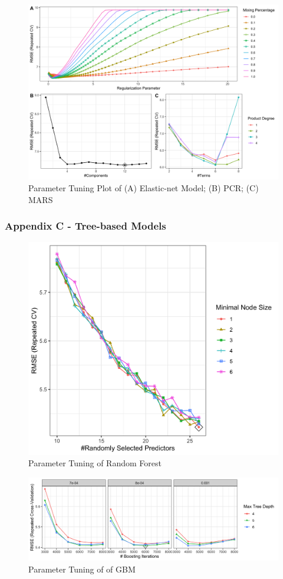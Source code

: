 \documentclass[
]{article}
\begin{document}
\begin{figure}
\centering
\includegraphics{report_figures/figure_appendix_B.png}
\caption{Parameter Tuning Plot of (A) Elastic-net Model; (B) PCR; (C)
MARS}
\end{figure}

\newpage

\hypertarget{appendix-c---tree-based-models}{%
\subsubsection{Appendix C - Tree-based
Models}\label{appendix-c---tree-based-models}}

\begin{figure}
\centering
\includegraphics{report_figures/appendixC_1.png}
\caption{Parameter Tuning of Random Forest}
\end{figure}

\begin{figure}
\centering
\includegraphics{report_figures/appendixC_figure1.png}
\caption{Parameter Tuning of of GBM}
\end{figure}
\end{document}
